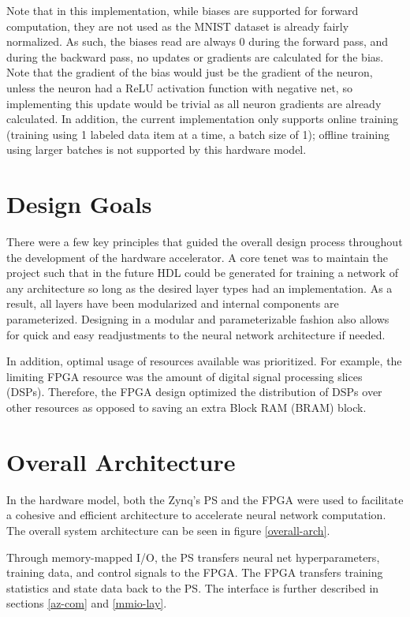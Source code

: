 Note that in this implementation, while biases are supported for forward computation, they are not used as the MNIST dataset is already fairly normalized. As such, the biases read are always 0 during the forward pass, and during the backward pass, no updates or gradients are calculated for the bias. Note that the gradient of the bias would just be the gradient of the neuron, unless the neuron had a ReLU activation function with negative net, so implementing this update would be trivial as all neuron gradients are already calculated. In addition, the current implementation only supports online training (training using 1 labeled data item at a time, a batch size of 1); offline training using larger batches is not supported by this hardware model.


\section{Design Goals}
There were a few key principles that guided the overall design process throughout the development of the hardware accelerator. A core tenet was to maintain the project such that in the future HDL could be generated for training a network of any architecture so long as the desired layer types had an implementation. As a result, all layers have been modularized and internal components are parameterized. Designing in a modular and parameterizable fashion also allows for quick and easy readjustments to the neural network architecture if needed.
\par 
In addition, optimal usage of resources available was prioritized. For example, the limiting FPGA resource was the amount of digital signal processing slices (DSPs). Therefore, the FPGA design optimized the distribution of DSPs over other resources as opposed to saving an extra Block RAM (BRAM) block. 

\section{Overall Architecture}
In the hardware model, both the Zynq's PS and the FPGA were used to facilitate a cohesive and efficient architecture to accelerate neural network computation. The overall system architecture can be seen in figure \ref{overall-arch}. 

Through memory-mapped I/O, the PS transfers neural net hyperparameters, training data, and control signals to the FPGA. The FPGA transfers training statistics and state data back to the PS. The interface is further described in sections \ref{az-com} and \ref{mmio-lay}.

